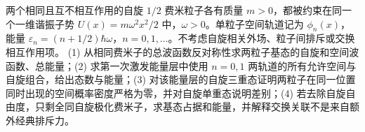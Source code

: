 两个相同且互不相互作用的自旋 \(1/2\) 费米粒子各有质量 \(m>0\)，都被约束在同一个一维谐振子势 \(U(x)=m\omega^2x^2/2\) 中，\(\omega>0\)。单粒子空间轨道记为 \(\phi_n(x)\)，能量 \(\varepsilon_n=(n+1/2)\hbar\omega\)，\(n=0,1,\ldots\)。不考虑自旋相关外场、粒子间排斥或交换相互作用项。
(1) 从相同费米子的总波函数反对称性求两粒子基态的自旋和空间波函数、总能量；(2) 求第一次激发能量层中使用 \(n=0,1\) 两轨道的所有允许空间与自旋组合，给出态数与能量；(3) 对该能量层的自旋三重态证明两粒子在同一位置同时出现的空间概率密度严格为零，并对自旋单重态说明差别；(4) 若去除自旋自由度，只剩全同自旋极化费米子，求基态占据和能量，并解释交换关联不是来自额外经典排斥力。
